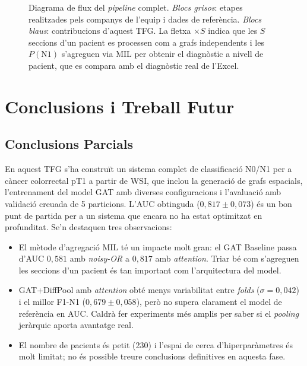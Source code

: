 \documentclass[10pt,a4paper,twocolumn,twoside]{article}
\begin{document}
\begin{figure}[h]
\caption{Diagrama de flux del \textit{pipeline} complet. \textit{Blocs grisos}: etapes
realitzades pels companys de l'equip i dades de referència. \textit{Blocs blaus}:
contribucions d'aquest TFG. La fletxa ${\times}S$ indica que les $S$ seccions d'un
pacient es processen com a grafs independents i les $P(\text{N1})$ s'agreguen via MIL
per obtenir el diagnòstic a nivell de pacient, que es compara amb el diagnòstic real
de l'Excel.}
\label{fig:pipeline}
\end{figure}

\section{Conclusions i Treball Futur}

\subsection{Conclusions Parcials}

En aquest TFG s'ha construït un sistema complet de classificació N0/N1 per a càncer
colorrectal pT1 a partir de WSI, que inclou la generació de grafs espacials, l'entrenament
del model GAT amb diverses configuracions i l'avaluació amb validació creuada de 5
particions. L'AUC obtinguda ($0{,}817 \pm 0{,}073$) és un bon punt de partida per a un
sistema que encara no ha estat optimitzat en profunditat. Se'n destaquen tres
observacions:

\begin{itemize}
  \item El mètode d'agregació MIL té un impacte molt gran: el GAT Baseline passa d'AUC
  $0{,}581$ amb \textit{noisy-OR} a $0{,}817$ amb \textit{attention}. Triar bé com
  s'agreguen les seccions d'un pacient és tan important com l'arquitectura del model.
  \item GAT+DiffPool amb \textit{attention} obté menys variabilitat entre
  \textit{folds} ($\sigma\!=\!0{,}042$) i el millor F1-N1 ($0{,}679 \pm 0{,}058$),
  però no supera clarament el model de referència en AUC. Caldrà fer experiments
  més amplis per saber si el \textit{pooling} jeràrquic aporta avantatge real.
  \item El nombre de pacients és petit (230) i l'espai de cerca d'hiperparàmetres és
  molt limitat; no és possible treure conclusions definitives en aquesta fase.
\end{itemize}
\end{document}
